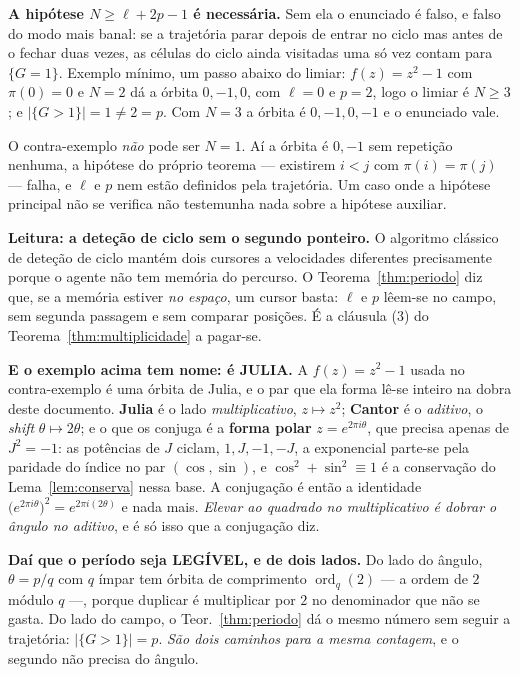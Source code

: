 \documentclass[11pt,a4paper]{article}
\begin{document}
\medskip\noindent\textbf{A hipótese $N\ge\ell+2p-1$ é necessária.} Sem ela o
enunciado é falso, e falso do modo mais banal: se a trajetória parar depois de
entrar no ciclo mas antes de o fechar duas vezes, as células do ciclo ainda
visitadas uma só vez contam para $\{G=1\}$. Exemplo mínimo, um passo abaixo do
limiar: $f(z)=z^2-1$ com $\pi(0)=0$ e $N=2$ dá a órbita $0,-1,0$, com
$\ell=0$ e $p=2$, logo o limiar é $N\ge3$; e
$\lvert\{G>1\}\rvert=1\neq2=p$. Com $N=3$ a órbita é $0,-1,0,-1$ e o enunciado
vale.

\medskip\noindent O contra-exemplo \emph{não} pode ser $N=1$. Aí a órbita é
$0,-1$ sem repetição nenhuma, a hipótese do próprio teorema --- existirem $i<j$
com $\pi(i)=\pi(j)$ --- falha, e $\ell$ e $p$ nem estão definidos pela
trajetória. Um caso onde a hipótese principal não se verifica não testemunha
nada sobre a hipótese auxiliar.

\medskip\noindent\textbf{Leitura: a deteção de ciclo sem o segundo ponteiro.} O
algoritmo clássico de deteção de ciclo mantém dois cursores a velocidades
diferentes precisamente porque o agente não tem memória do percurso. O
Teorema~\ref{thm:periodo} diz que, se a memória estiver \emph{no espaço}, um
cursor basta: $\ell$ e $p$ lêem-se no campo, sem segunda passagem e sem comparar
posições. É a cláusula (3) do Teorema~\ref{thm:multiplicidade} a pagar-se.

\medskip\noindent\textbf{E o exemplo acima tem nome: é JULIA.} A $f(z)=z^{2}-1$
usada no contra-exemplo é uma órbita de Julia, e o par que ela forma lê-se
inteiro na dobra deste documento. \textbf{Julia} é o lado \emph{multiplicativo},
$z\mapsto z^{2}$; \textbf{Cantor} é o \emph{aditivo}, o \emph{shift}
$\theta\mapsto2\theta$; e o que os conjuga é a \textbf{forma polar}
$z=e^{2\pi i\theta}$, que precisa apenas de $J^{2}=-1$: as potências de $J$
ciclam, $1,J,-1,-J$, a exponencial parte-se pela paridade do índice no par
$(\cos,\sin)$, e $\cos^{2}+\sin^{2}\equiv1$ é a conservação do
Lema~\ref{lem:conserva} nessa base. A conjugação é então a identidade
$\bigl(e^{2\pi i\theta}\bigr)^{2}=e^{2\pi i(2\theta)}$ e nada mais. \emph{Elevar ao quadrado no
multiplicativo é dobrar o ângulo no aditivo}, e é só isso que a conjugação diz.

\medskip\noindent\textbf{Daí que o período seja LEGÍVEL, e de dois lados.} Do
lado do ângulo, $\theta=p/q$ com $q$ ímpar tem órbita de comprimento
$\operatorname{ord}_q(2)$ --- a ordem de $2$ módulo $q$ ---, porque duplicar é
multiplicar por $2$ no denominador que não se gasta. Do lado do campo, o
Teor.~\ref{thm:periodo} dá o mesmo número sem seguir a trajetória:
$\lvert\{G>1\}\rvert=p$. \emph{São dois caminhos para a mesma contagem}, e o
segundo não precisa do ângulo.
\end{document}
